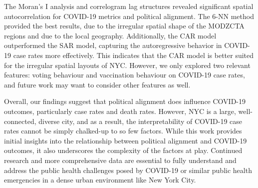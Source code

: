 \documentclass[10pt,journal,compsoc]{IEEEtran}
\newif\ifpeerreview
\begin{document}
The Moran's I analysis and correlogram lag structures revealed significant spatial autocorrelation for COVID-19 metrics and political alignment. The 6-NN method provided the best results, due to the irregular spatial shape of the MODZCTA regions and due to the local geography. Additionally, the CAR model outperformed the SAR model, capturing the autoregressive behavior in COVID-19 case rates more effectively. This indicates that the CAR model is better suited for the irregular spatial layouts of NYC. However, we only explored two relevant features: voting behaviour and vaccination behaviour on COVID-19 case rates, and future work may want to consider other features as well.

Overall, our findings suggest that political alignment does influence COVID-19 outcomes, particularly case rates and death rates. However, NYC is a large, well-connected, diverse city, and as a result, the interpretability of COVID-19 case rates cannot be simply chalked-up to so few factors. While this work provides initial insights into the relationship between political alignment and COVID-19 outcomes, it also underscores the complexity of the factors at play. Continued research and more comprehensive data are essential to fully understand and address the public health challenges posed by COVID-19 or similar public health emergencies in a dense urban environment like New York City.









\end{document}
